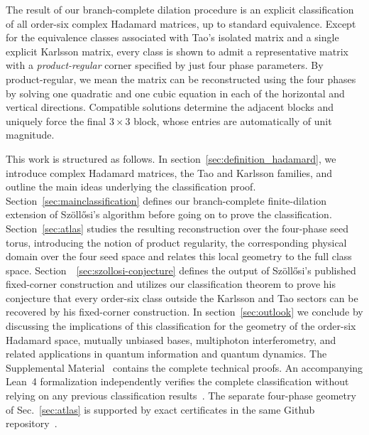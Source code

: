 \documentclass[aps,prx,reprint,nofootinbib,twoside,superscriptaddress,longbibliography,floatfix]{revtex4-2}
\theoremstyle{definition}
\begin{document}
The result of our branch-complete dilation procedure is an explicit classification of all order-six complex Hadamard matrices, up to standard equivalence.
Except for the equivalence classes associated with Tao's isolated matrix and a single explicit Karlsson matrix, every class is shown to admit a representative matrix with a \textit{product-regular} corner specified by just four phase parameters. 
By product-regular, we mean the matrix can be reconstructed using the four phases by solving one quadratic and one cubic equation in each of the horizontal and vertical directions. Compatible solutions determine the adjacent blocks and uniquely force the final $3\times3$ block, whose entries are automatically of unit magnitude.

This work is structured as follows. In section~\ref{sec:definition_hadamard}, we introduce complex Hadamard matrices, the Tao and Karlsson families, and outline the main ideas underlying the classification proof.
Section~\ref{sec:mainclassification} defines our branch-complete finite-dilation extension of Sz\"oll\H{o}si's algorithm before going on to prove the classification.
Section~\ref{sec:atlas} studies the resulting reconstruction over the four-phase seed torus, introducing the notion of product regularity, the corresponding physical domain over the four seed space and relates this local geometry to the full class space.
Section~~\ref{sec:szollosi-conjecture} defines the output of Sz\"oll\H{o}si's published fixed-corner construction and utilizes our classification theorem to prove his conjecture that every order-six class outside the Karlsson and Tao sectors can be recovered by his fixed-corner construction.
In section~\ref{sec:outlook} we conclude by discussing the implications of this classification for the geometry of the order-six Hadamard space, mutually unbiased bases, multiphoton interferometry, and related applications in quantum information and quantum dynamics.
The Supplemental Material~\cite{SupplementalMaterial} contains the complete technical proofs. An accompanying Lean~4 formalization independently verifies the complete classification without relying on any previous classification results~\cite{deMouraUllrich2021,CardenesWuttig2026HadamardRepository}. The separate four-phase geometry of Sec.~\ref{sec:atlas} is supported by exact certificates in the same Github repository~\cite{CardenesWuttig2026HadamardRepository}.
\end{document}
